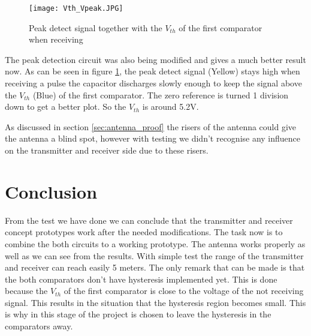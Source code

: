 \begin{figure}[H]
\centering
\texttt{[image: Vth\_Vpeak.JPG]}
\caption{Peak detect signal together with the $V_{th}$ of the first comparator when receiving}\label{fig:peakvth}
\end{figure}

The peak detection circuit was also being modified and gives a much better result now. As can be seen in figure \ref{fig:peakvth}, the peak detect signal (Yellow) stays high when receiving a pulse the capacitor discharges slowly enough to keep the signal above the $V_{th}$ (Blue) of the first comparator. The zero reference is turned 1 division down to get a better plot. So the $V_{th}$ is around 5.2V.

As discussed in section \ref{sec:antenna_proof} the risers of the antenna could give the antenna a blind spot, however with testing we didn't recognise any influence on the transmitter and receiver side due to these risers.

\section{Conclusion}
From the test we have done we can conclude that the transmitter and receiver concept prototypes work after the needed modifications. The task now is to combine the both circuits to a working prototype.
The antenna works properly as well as we can see from the results. With simple test the range of the transmitter and receiver can reach easily 5 meters.
The only remark that can be made is that the both comparators don't have hysteresis implemented yet. This is done because the $V_{th}$ of the first comparator is close to the voltage of the not receiving signal. This results in the situation that the hysteresis region becomes small. This is why in this stage of the project is chosen to leave the hysteresis in the comparators away.
